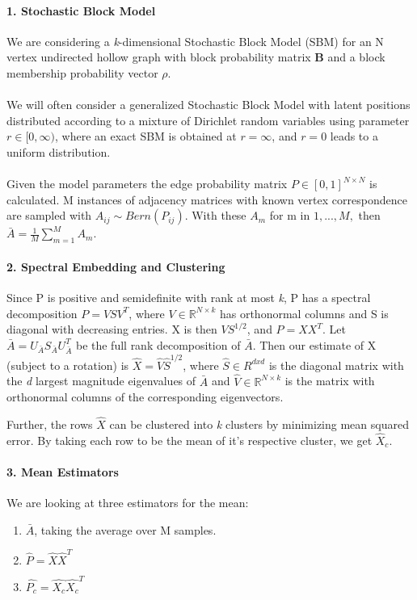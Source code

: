 \documentclass[10pt]{article}
\begin{document}
\paragraph{1. Stochastic Block Model}
We are considering a \textit{k}-dimensional Stochastic Block Model (SBM) for an N vertex undirected hollow graph with block probability matrix \textbf{B} and a block membership probability vector $\rho$.\\\\
We will often consider a generalized Stochastic Block Model with latent positions distributed according to a mixture of Dirichlet random variables using parameter $r \in [0,  \infty )$,  where an exact SBM is obtained at $r = \infty$, and $r = 0$ leads to a uniform distribution.\\\\
Given the model parameters the edge probability matrix $P \in [0,1]^{N\times N}$ is calculated.  M instances of adjacency matrices with known vertex correspondence are sampled with $A_{ij} \sim Bern(P_{ij})$.  With these $A_m$ for m in $1,...,M,$ then $\bar{A} = \frac{1}{M}\sum\limits_{m = 1}^M A_m$.

\paragraph{2. Spectral Embedding and Clustering} Since P is positive and semidefinite with rank at most \textit{k}, P has a spectral decomposition $P = VSV^T$, where $V \in \mathbb{R}^{N\times k}$ has orthonormal columns and S is diagonal with decreasing entries.  X is then $VS^{1/2}$, and $P=XX^T$.  Let $\bar{A} = U_{\bar{A}}S_{\bar{A}}U_{\bar{A}}^T$ be the full rank decomposition of $\bar{A}$.  Then our estimate of X (subject to a rotation) is $\hat{X} = \hat{V}\hat{S}^{1/2}$, where $\hat{S} \in R^{dxd}$ is the diagonal matrix with the \textit{d} largest magnitude eigenvalues of $\bar{A}$ and $\hat{V} \in \mathbb{R}^{N\times k}$ is the matrix with orthonormal columns of the corresponding eigenvectors.

Further, the rows $\hat{X}$ can be clustered into \textit{k} clusters by minimizing mean squared error.  By taking each row to be the mean of it's respective cluster, we get $\hat{X}_c$.

\paragraph{3. Mean Estimators}  We are looking at three estimators for the mean:
\begin{enumerate}
\item $\bar{A}$, taking the average over M samples.
\item $\hat{P} = \hat{X}\hat{X}^T$
\item $\hat{P_c} = \hat{X_c}\hat{X_c}^T$
\end{enumerate}
\end{document}
